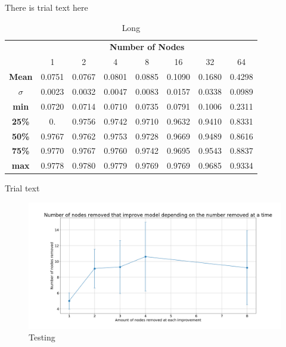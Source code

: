\documentclass[UKenglish]{ifimaster}
\begin{document}
            There is trial text here

            \begin{table}[h!]
                \centering
                \begin{tabular}{c | c c c c c c c}
                    & \multicolumn{7}{c}{\textbf{Number of Nodes}} \\
                    \cline{2-8}
                    & 1 & 2 & 4 & 8 & 16 & 32 & 64 \\
                    \hline
                    \textbf{Mean} & 0.0751 & 0.0767 & 0.0801 & 0.0885 & 0.1090 & 0.1680 & 0.4298 \\
                    \textbf{$\sigma$} & 0.0023 & 0.0032 & 0.0047 & 0.0083 & 0.0157 & 0.0338 & 0.0989 \\
                    \textbf{min} & 0.0720 & 0.0714 & 0.0710 & 0.0735 & 0.0791 & 0.1006 & 0.2311 \\
                    \textbf{25\%} & 0. & 0.9756 & 0.9742 & 0.9710 & 0.9632 & 0.9410 & 0.8331 \\
                    \textbf{50\%} & 0.9767 & 0.9762 & 0.9753 & 0.9728 & 0.9669 & 0.9489 & 0.8616 \\
                    \textbf{75\%} & 0.9770 & 0.9767 & 0.9760 & 0.9742 & 0.9695 & 0.9543 & 0.8837 \\
                    \textbf{max} & 0.9778 & 0.9780 & 0.9779 & 0.9769 & 0.9769 & 0.9685 & 0.9334 \\
                    
                \end{tabular}
                \caption[Short]{Long}
            \end{table}

            Trial text

            \begin{figure}[h!]\centering
                \includegraphics[width=\textwidth]{Num_rem_vs_size_removed_fmnist.png}
                \caption[Short title]{Testing}
                \label{fig:num_rem_rn_imp_fmnist}
            \end{figure}
\end{document}
